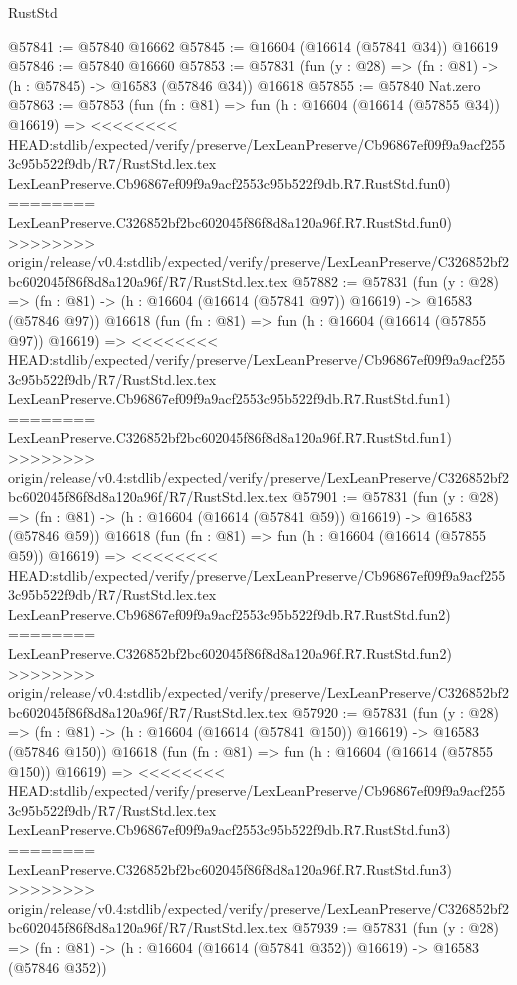 \begin{lexlean}{RustStd}
\begin{coremodule}
{\begin{coremodule}
{{{{{{{{{{{{{{{{{{{{{{{{{{{{{{{{{{{{{{{{{{{{{{{{{{{{{{{@57841 := @57840 @16662
@57845 := @16604 (@16614 (@57841 @34)) @16619
@57846 := @57840 @16660
@57853 := @57831 (fun (y : @28) => (fn : @81) -> (h : @57845) -> @16583 (@57846 @34)) @16618
@57855 := @57840 Nat.zero
@57863 := @57853
    (fun (fn : @81) =>
    fun (h : @16604 (@16614 (@57855 @34)) @16619) =>
<<<<<<<< HEAD:stdlib/expected/verify/preserve/LexLeanPreserve/Cb96867ef09f9a9acf2553c95b522f9db/R7/RustStd.lex.tex
    LexLeanPreserve.Cb96867ef09f9a9acf2553c95b522f9db.R7.RustStd.fun0)
========
    LexLeanPreserve.C326852bf2bc602045f86f8d8a120a96f.R7.RustStd.fun0)
>>>>>>>> origin/release/v0.4:stdlib/expected/verify/preserve/LexLeanPreserve/C326852bf2bc602045f86f8d8a120a96f/R7/RustStd.lex.tex
@57882 := @57831
    (fun (y : @28) =>
    (fn : @81) -> (h : @16604 (@16614 (@57841 @97)) @16619) -> @16583 (@57846 @97))
    @16618
    (fun (fn : @81) =>
    fun (h : @16604 (@16614 (@57855 @97)) @16619) =>
<<<<<<<< HEAD:stdlib/expected/verify/preserve/LexLeanPreserve/Cb96867ef09f9a9acf2553c95b522f9db/R7/RustStd.lex.tex
    LexLeanPreserve.Cb96867ef09f9a9acf2553c95b522f9db.R7.RustStd.fun1)
========
    LexLeanPreserve.C326852bf2bc602045f86f8d8a120a96f.R7.RustStd.fun1)
>>>>>>>> origin/release/v0.4:stdlib/expected/verify/preserve/LexLeanPreserve/C326852bf2bc602045f86f8d8a120a96f/R7/RustStd.lex.tex
@57901 := @57831
    (fun (y : @28) =>
    (fn : @81) -> (h : @16604 (@16614 (@57841 @59)) @16619) -> @16583 (@57846 @59))
    @16618
    (fun (fn : @81) =>
    fun (h : @16604 (@16614 (@57855 @59)) @16619) =>
<<<<<<<< HEAD:stdlib/expected/verify/preserve/LexLeanPreserve/Cb96867ef09f9a9acf2553c95b522f9db/R7/RustStd.lex.tex
    LexLeanPreserve.Cb96867ef09f9a9acf2553c95b522f9db.R7.RustStd.fun2)
========
    LexLeanPreserve.C326852bf2bc602045f86f8d8a120a96f.R7.RustStd.fun2)
>>>>>>>> origin/release/v0.4:stdlib/expected/verify/preserve/LexLeanPreserve/C326852bf2bc602045f86f8d8a120a96f/R7/RustStd.lex.tex
@57920 := @57831
    (fun (y : @28) =>
    (fn : @81) -> (h : @16604 (@16614 (@57841 @150)) @16619) -> @16583 (@57846 @150))
    @16618
    (fun (fn : @81) =>
    fun (h : @16604 (@16614 (@57855 @150)) @16619) =>
<<<<<<<< HEAD:stdlib/expected/verify/preserve/LexLeanPreserve/Cb96867ef09f9a9acf2553c95b522f9db/R7/RustStd.lex.tex
    LexLeanPreserve.Cb96867ef09f9a9acf2553c95b522f9db.R7.RustStd.fun3)
========
    LexLeanPreserve.C326852bf2bc602045f86f8d8a120a96f.R7.RustStd.fun3)
>>>>>>>> origin/release/v0.4:stdlib/expected/verify/preserve/LexLeanPreserve/C326852bf2bc602045f86f8d8a120a96f/R7/RustStd.lex.tex
@57939 := @57831
    (fun (y : @28) =>
    (fn : @81) -> (h : @16604 (@16614 (@57841 @352)) @16619) -> @16583 (@57846 @352))
}}}}}}}}}}}}}}}}}}}}}}}}}}}}}}}}}}}}}}}}}}}}}}}}}}}}}}}
\end{coremodule}}
\end{coremodule}
\end{lexlean}
